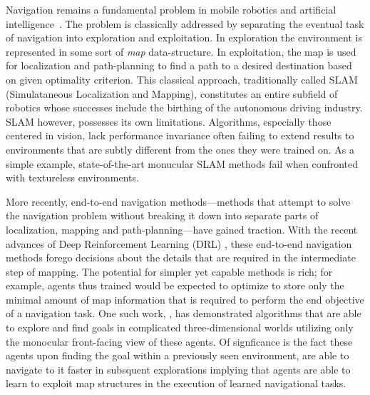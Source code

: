 
Navigation remains a fundamental problem in mobile robotics and artificial intelligence~\cite{SmChIJRR1986,ElCOMPUTER1980}.
The problem is classically addressed by separating the eventual task of navigation into exploration and exploitation. 
In exploration the environment is represented in some sort of \emph{map} data-structure. 
In exploitation, the map is used for localization and path-planning to find a path to a desired destination based on given optimality criterion. 
This classical approach, traditionally called SLAM (Simulataneous Localization and Mapping), constitutes an entire subfield of robotics whose successes include the birthing of the autonomous driving industry. 
SLAM however, possesses its own limitations. Algorithms, especially those centered in vision, lack performance invariance often failing to extend results to environments that are subtly different from the ones they were trained on. As a simple example, state-of-the-art monucular SLAM methods fail when confronted with textureless environments.

More recently, end-to-end navigation methods---methods that attempt to  
solve the navigation problem without breaking it down into separate parts of localization, mapping and path-planning---have gained traction.
%
With the recent advances of Deep Reinforcement Learning (DRL) \cite{MnKaSiNATURE2015}, these end-to-end navigation methods \cite{MnBaMiICML2016,SiHuMaNATURE2016,LePaKrISER2017,MiPaViICLR2017,OhChSiICML2016} forego decisions about the details that are required in the intermediate step of mapping.
The potential for simpler yet capable methods is rich; for example, agents thus trained would be expected to optimize to store only the minimal amount of map information that is required to perform the end objective of a navigation task.
One such work, \cite{MiPaViICLR2017}, has demonstrated algorithms that are able to explore and find goals in complicated three-dimensional worlds utilizing only the monocular front-facing view of these agents. Of signficance is the fact these agents upon finding the goal within a previously seen environment, are able to navigate to it faster in subsquent explorations implying that agents are able to learn to exploit map structures in the execution of learned navigational tasks. 


